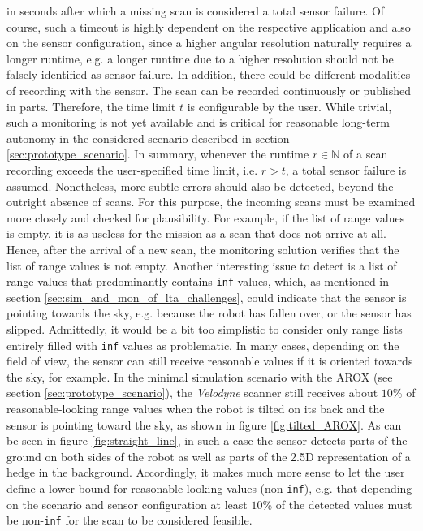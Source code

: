 \documentclass[english, master, utf8]{base/thesis_KBS}
\newcommand{\code}[1]{\colorbox{light-gray}{\texttt{#1}}}
\begin{document}
in seconds after which a missing scan is considered a total sensor failure. Of course, such a timeout is highly dependent on the respective application and also on the sensor 
configuration, since a higher angular resolution naturally requires a longer runtime, e.g. a longer runtime due to a higher resolution should not be falsely identified 
as sensor failure. In addition, there could be different modalities of recording with the sensor. The scan can be recorded continuously or published in parts.
Therefore, the time limit $t$ is configurable by the user. While trivial, such a monitoring is not yet available and is critical for reasonable long-term autonomy in the 
considered scenario described in section \ref{sec:prototype_scenario}. In summary, whenever the runtime $r \in \mathbb{N}$ of a scan recording exceeds the user-specified time
limit, i.e. $r > t$, a total sensor failure is assumed. Nonetheless, more subtle errors should also be detected, beyond the outright absence of scans.
For this purpose, the incoming scans must be examined more closely and checked for plausibility. For example, if the list of range values is empty, it is as useless for
the mission as a scan that does not arrive at all. Hence, after the arrival of a new scan, the monitoring solution verifies that the list of range values is not empty.
Another interesting issue to detect is a list of range values that predominantly contains \code{inf} values, which, as mentioned in section
\ref{sec:sim_and_mon_of_lta_challenges}, could indicate that the sensor is pointing towards the sky, e.g. because the robot has fallen over,
or the sensor has slipped. Admittedly, it would be a bit too simplistic to consider only range lists entirely filled with \code{inf} values as problematic.
In many cases, depending on the field of view, the sensor can still receive reasonable values if it is oriented towards the sky, for example.
In the minimal simulation scenario with the AROX (see section \ref{sec:prototype_scenario}), the \textit{Velodyne} scanner still receives about $10$\% of 
reasonable-looking range values when the robot is tilted on its back and the sensor is pointing toward the sky, as shown in figure \ref{fig:tilted_AROX}.
As can be seen in figure \ref{fig:straight_line}, in such a case the sensor detects parts of the ground on both sides of the robot as well as parts of the 2.5D 
representation of a hedge in the background. Accordingly, it makes much more sense to let the user define a lower bound for reasonable-looking values (non-\code{inf}),
e.g. that depending on the scenario and sensor configuration at least $10$\% of the detected values must be non-\code{inf} for the scan to be considered feasible.
\end{document}
